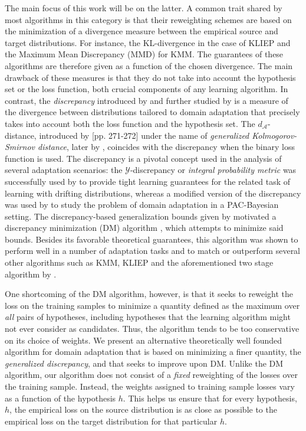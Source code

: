 \documentclass[twoside,11pt]{article}
\newcommand{\cA}{{\mathcal A}}
\newcommand{\cY}{{\mathcal Y}}
\newcommand{\1}{\mat{1}}
\begin{document}
The main focus of this work will be on the latter. A common trait
shared by most algorithms in this category is that their reweighting
schemes are based on the minimization of a divergence measure between
the empirical source and target distributions. For instance, the
KL-divergence in the case of KLIEP and the Maximum Mean Discrepancy
(MMD) \citep{GrettonMMD} for KMM. The guarantees of these algorithms
are therefore given as a function of the chosen divergence. The main
drawback of these measures is that they do not take into account the
hypothesis set or the loss function, both crucial components of any
learning algorithm. In contrast, the \emph{discrepancy} introduced by
\cite{MansourMohriRostamizadeh2009} and further studied by
\cite{CortesMohri2011} is a measure of the divergence between
distributions tailored to domain adaptation that precisely takes into
account both the loss function and the hypothesis set.  The
$d_\cA$-distance, introduced by
\cite{DevroyeGyorfiLugosi1996}[pp. 271-272] under the name of
\emph{generalized Kolmogorov-Smirnov distance}, later by
\cite{BenDavidBlitzerCrammerPereira2006}, coincides with the
discrepancy when the binary loss function is used.  The discrepancy is
a pivotal concept used in the analysis of several adaptation
scenarios:  the $\cY$-discrepancy or \emph{integral
  probability metric} \citep{ZhangZhangYe2012} was successfully used
by \cite{drift}
to provide tight learning guarantees for the related task of learning
with drifting distributions, whereas a modified version of the
discrepancy was used by \cite{germain2013pac} to study the problem of
domain adaptation in a PAC-Bayesian setting. The discrepancy-based
generalization bounds given by \cite{MansourMohriRostamizadeh2009}
motivated a discrepancy minimization (DM) algorithm
\citep{CortesMohri2013}, which attempts to minimize said
bounds. Besides its favorable theoretical guarantees, this algorithm
was shown to perform well in a number of adaptation tasks and to match
or outperform several other algorithms such as KMM, KLIEP and the
aforementioned two stage algorithm by
\citet{BickelBrucknerScheffer2007}.

One shortcoming of the DM algorithm, however, is that it seeks to
reweight the loss on the training samples to minimize a quantity
defined as the maximum over \emph{all} pairs of hypotheses, including
hypotheses that the learning algorithm might not ever consider as
candidates. Thus, the algorithm tends to be too conservative on its
choice of weights. We present an alternative theoretically well
founded algorithm for domain adaptation that is based on minimizing a
finer quantity, the \emph{generalized discrepancy}, and that seeks to
improve upon DM.  Unlike the DM algorithm, our algorithm does not
consist of a \emph{fixed} reweighting of the losses over the training
sample. Instead, the weights assigned to training sample losses vary
as a function of the hypothesis $h$. This helps us ensure that for
every hypothesis, $h$, the empirical loss on the source distribution
is as close as possible to the empirical loss on the target
distribution for that particular $h$.
\end{document}
